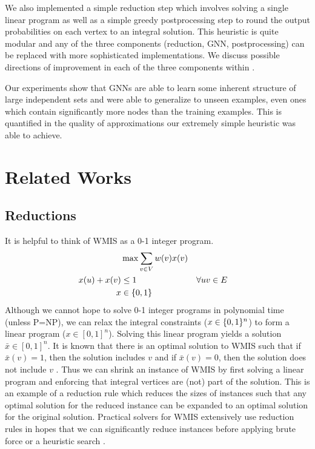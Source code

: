 \documentclass{article}
\DeclarePairedDelimiter{\set}{\lbrace}{\rbrace}
\begin{document}
We also implemented a simple reduction step which involves solving a single linear program
as well as a simple greedy postprocessing step to round the output probabilities on each vertex to an integral solution.
This heuristic is quite modular and any of the three components
(reduction, GNN, postprocessing)
can be replaced with more sophisticated implementations.
We discuss possible directions of improvement in each of the three components
within .

Our experiments show that GNNs are able to learn some inherent structure of large independent sets
and were able to generalize to unseen examples,
even ones which contain significantly more nodes than the training examples.
This is quantified in the quality of approximations our extremely simple heuristic was able to achieve.

\section{Related Works}
\subsection{Reductions}
It is helpful to think of WMIS as a 0-1 integer program.
\begin{align*}
  &\max \sum_{v\in V} w(v) x(v) \\
  x(u) + x(v) &\leq 1 &&\forall uv\in E \\
  x &\in \set{0, 1}
\end{align*}
Although we cannot hope to solve 0-1 integer programs in polynomial time
(unless P=NP),
we can relax the integral constraints ($x\in \set{0, 1}^n$)
to form a linear program ($x\in [0, 1]^n$).
Solving this linear program yields a solution $\bar x\in [0, 1]^n$.
It is known that there is an optimal solution to WMIS
such that if $\bar x(v) = 1$,
then the solution includes $v$
and if $\bar x(v) = 0$,
then the solution does not include $v$ \citet{lpreduction}.
Thus we can shrink an instance of WMIS by first solving a linear program
and enforcing that integral vertices are (not) part of the solution.
This is an example of a reduction rule
which reduces the sizes of instances
such that any optimal solution for the reduced instance can be expanded to an optimal solution
for the original solution.
Practical solvers for WMIS extensively use reduction rules
in hopes that we can significantly reduce instances
before applying brute force or a heuristic search \cite{kamis}.
\end{document}
